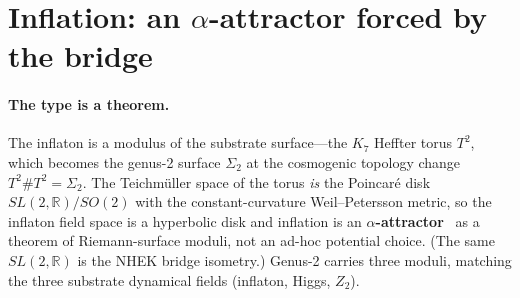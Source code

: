 \documentclass[11pt]{article}
\begin{document}
\section{Inflation: an $\alpha$-attractor forced by the bridge}
\label{sec:inflation}

\paragraph{The type is a theorem.} The inflaton is a modulus of the substrate surface---the $K_7$ Heffter torus $T^2$, which becomes the genus-2 surface $\Sigma_2$ at the cosmogenic topology change $T^2 \# T^2 = \Sigma_2$. The Teichm\"uller space of the torus \emph{is} the Poincar\'e disk $SL(2,\mathbb{R})/SO(2)$ with the constant-curvature Weil--Petersson metric, so the inflaton field space is a hyperbolic disk and inflation is an \textbf{$\alpha$-attractor}~\cite{KalloshLinde} as a theorem of Riemann-surface moduli, not an ad-hoc potential choice. (The same $SL(2,\mathbb{R})$ is the NHEK bridge isometry.) Genus-2 carries three moduli, matching the three substrate dynamical fields (inflaton, Higgs, $Z_2$).
\end{document}
